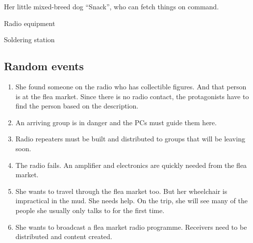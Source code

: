 \begin{npcBox}[title=Antigone]
    \begin{stressSection}
    \end{stressSection}
    \begin{tabularx}{\textwidth}{ XX }
    \end{tabularx}

    \begin{consequences}
    \item {}
    \item {}
    \item {}
    \end{consequences}

    \begin{equipment}
    \item Her little mixed-breed dog “Snack”, who can fetch things on command.
    \item Radio equipment
    \item Soldering station
    \end{equipment}
\end{npcBox}

\subsection{Random events}

\begin{enumerate}
\item She found someone on the radio who has collectible figures. And that person is at the flea market. Since there is no radio contact, the protagonists have to find the person based on the description.
\item An arriving group is in danger and the PCs must guide them here.
\item Radio repeaters must be built and distributed to groups that will be leaving soon.
\item The radio fails. An amplifier and electronics are quickly needed from the flea market.
\item She wants to travel through the flea market too. But her wheelchair is impractical in the mud. She needs help. On the trip, she will see many of the people she usually only talks to for the first time.
\item She wants to broadcast a flea market radio programme. Receivers need to be distributed and content created.
\end{enumerate}

